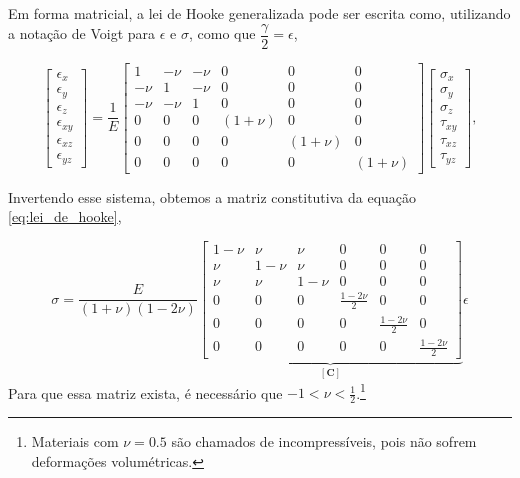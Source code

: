 Em forma matricial, a lei de Hooke generalizada pode ser escrita como, utilizando a notação de Voigt para ${\epsilon}$ e ${\sigma}$, como que $\dfrac{\gamma}{2} = \epsilon$,

\begin{equation}
    \begin{bmatrix}
        \epsilon_x \\
        \epsilon_y \\
        \epsilon_z \\
        \epsilon_{xy} \\
        \epsilon_{xz} \\
        \epsilon_{yz}
    \end{bmatrix}
    =
    \frac{1}{E}
    \begin{bmatrix}
        1 & -\nu & -\nu & 0 & 0 & 0 \\
        -\nu & 1 & -\nu & 0 & 0 & 0 \\
        -\nu & -\nu & 1 & 0 & 0 & 0 \\
        0 & 0 & 0 & (1+\nu) & 0 & 0 \\
        0 & 0 & 0 & 0 & (1+\nu) & 0 \\
        0 & 0 & 0 & 0 & 0 & (1+\nu)
    \end{bmatrix}
    \begin{bmatrix}
        \sigma_x \\
        \sigma_y \\
        \sigma_z \\
        \tau_{xy} \\
        \tau_{xz} \\
        \tau_{yz}
    \end{bmatrix},
    \label{eq:lei_de_hooke_generalizada_matricial}
\end{equation}

Invertendo esse sistema, obtemos a matriz constitutiva da equação \ref{eq:lei_de_hooke},

\begin{equation}
    {\sigma} = \frac{E}{(1+\nu)(1-2\nu)}
    \underbrace{\begin{bmatrix} 1-\nu & \nu & \nu & 0 & 0 & 0 \\
        \nu & 1-\nu & \nu & 0 & 0 & 0 \\
        \nu & \nu & 1-\nu & 0 & 0 & 0 \\
        0 & 0 & 0 & \frac{1-2\nu}{2} & 0 & 0 \\
        0 & 0 & 0 & 0 & \frac{1-2\nu}{2} & 0 \\
        0 & 0 & 0 & 0 & 0 & \frac{1-2\nu}{2} 
    \end{bmatrix}}_{[\bm{C}]}
    {\epsilon}
\end{equation}
Para que essa matriz exista, é necessário que $-1 < \nu < \frac{1}{2}$.\footnote{Materiais com $\nu = 0.5$ são chamados de incompressíveis, pois não sofrem deformações volumétricas.}


